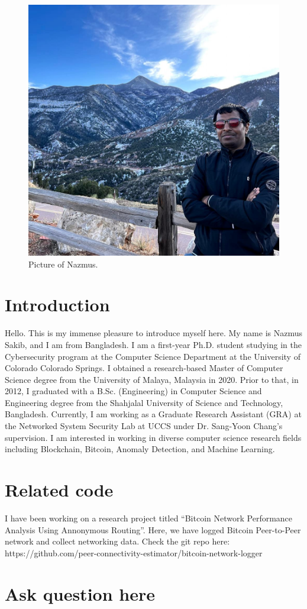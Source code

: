 

\begin{figure}[h!]
\centering
\includegraphics[width=.5\columnwidth]{picture-nazmus.jpg}
\caption{Picture of Nazmus.}
\label{fig:my-picture}
\end{figure}

\section{Introduction}

Hello. This is my immense pleasure to introduce myself here. My name is Nazmus Sakib, and I am from Bangladesh. I am a first-year Ph.D. student studying in the Cybersecurity program at the Computer Science Department at the University of Colorado Colorado Springs. I obtained a research-based Master of Computer Science degree from the University of Malaya, Malaysia in 2020. Prior to that, in 2012, I graduated with a B.Sc. (Engineering) in Computer Science and Engineering degree from the Shahjalal University of Science and Technology, Bangladesh. Currently, I am working as a Graduate Research Assistant (GRA) at the Networked System Security Lab at UCCS under Dr. Sang-Yoon Chang's supervision. I am interested in working in diverse computer science research fields including Blockchain, Bitcoin, Anomaly Detection, and Machine Learning.

\section{Related code}

I have been working on a research project titled ``Bitcoin Network Performance Analysis Using Annonymous Routing''. Here, we have logged Bitcoin Peer-to-Peer network and collect networking data.
Check the git repo here: https://github.com/peer-connectivity-estimator/bitcoin-network-logger

\section{Ask question here}